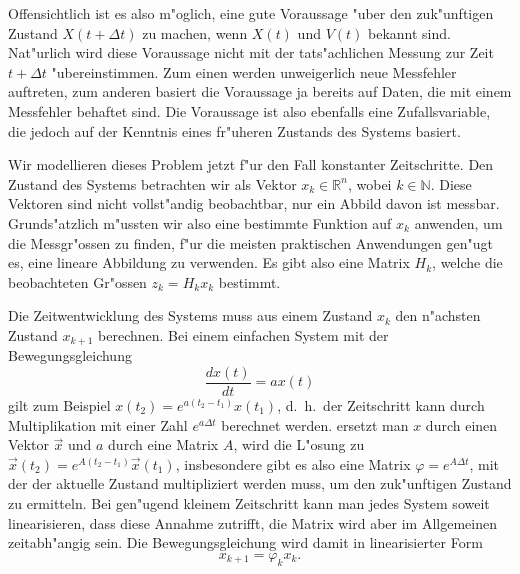 Offensichtlich ist es also m"oglich, eine gute Voraussage "uber den
zuk"unftigen Zustand $X(t+\Delta t)$ zu machen, wenn $X(t)$ und $V(t)$
bekannt sind. Nat"urlich wird diese Voraussage nicht mit der tats"achlichen
Messung zur Zeit $t+\Delta t$ "ubereinstimmen. Zum einen werden unweigerlich
neue Messfehler auftreten, zum anderen basiert die Voraussage ja bereits
auf Daten, die mit einem Messfehler behaftet sind. Die Voraussage ist also
ebenfalls eine Zufallsvariable, die jedoch auf der Kenntnis eines fr"uheren
Zustands des Systems basiert.

Wir modellieren dieses Problem jetzt f"ur den Fall konstanter Zeitschritte.
Den Zustand des Systems betrachten wir als Vektor $x_k\in\mathbb{R}^n$,
wobei $k\in\mathbb{N}$. Diese Vektoren sind nicht vollst"andig beobachtbar,
nur ein Abbild davon ist messbar. Grunds"atzlich m"ussten wir also eine
bestimmte Funktion auf $x_k$ anwenden, um die Messgr"ossen zu finden,
f"ur die meisten praktischen Anwendungen gen"ugt es, eine lineare Abbildung
zu verwenden. Es gibt also eine Matrix $H_k$, welche die beobachteten
Gr"ossen $z_k=H_kx_k$ bestimmt.

Die Zeitwentwicklung des Systems muss aus einem Zustand $x_k$ den n"achsten
Zustand $x_{k+1}$ berechnen.
Bei einem
einfachen System mit der Bewegungsgleichung
\[
\frac{dx(t)}{dt}=ax(t)
\]
gilt zum Beispiel $x(t_2)=e^{a(t_2-t_1)}x(t_1)$, d.~h.~der Zeitschritt
kann durch Multiplikation mit einer Zahl $e^{a\Delta t}$ berechnet werden.
ersetzt man $x$ durch einen Vektor $\vec x$ und $a$ durch eine Matrix
$A$, wird die L"osung zu $\vec x(t_2)=e^{A(t_2-t_1)}\vec x(t_1)$,
insbesondere gibt es also eine Matrix $\varphi=e^{A\Delta t}$, mit
der der aktuelle Zustand multipliziert werden muss, um den zuk"unftigen
Zustand zu ermitteln. Bei gen"ugend kleinem Zeitschritt kann man jedes
System soweit linearisieren, dass diese Annahme zutrifft, die Matrix
wird aber im Allgemeinen zeitabh"angig sein. Die Bewegungsgleichung
wird damit in linearisierter Form
\[
x_{k+1}=\varphi_kx_k.
\]

